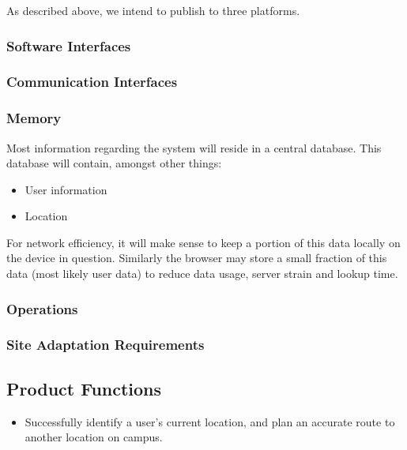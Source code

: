 \documentclass[10pt,a4paper]{article}
\begin{document}
				As described above, we intend to publish to three platforms.

			\subsubsection{Software Interfaces}



			\subsubsection{Communication Interfaces}

			\subsubsection{Memory}

				Most information regarding the system will reside in a central
				database. This database will contain, amongst other things:

				\begin{itemize}
					\item User information
					\item Location
				\end{itemize}

				For network efficiency, it will make sense to keep a portion of this
				data locally on the device in question. Similarly the browser may store
				a small fraction of this data (most likely user data) to reduce data
				usage, server strain and lookup time.

			\subsubsection{Operations}



			\subsubsection{Site Adaptation Requirements}

		\subsection{Product Functions}

			\begin{itemize}
				\item Successfully identify a user's current location, and plan an
							accurate route to another location on campus.
			\end{itemize}
\end{document}
